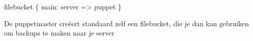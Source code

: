 	  filebucket \{ main:
	    server => puppet
	  \}

	De puppetmaster cre\"{e}ert standaard zelf een filebucket, die je dan kan gebruiken om backups te maken naar je server
%
%
%
%
%
%

